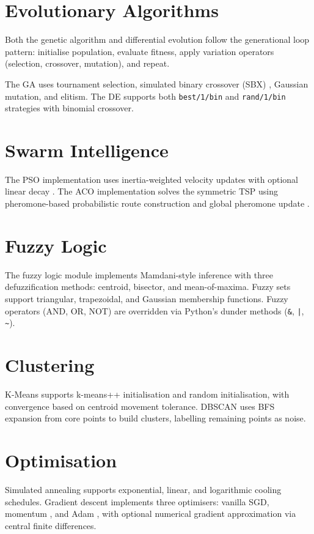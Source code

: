 \documentclass[12pt,a4paper,twoside]{report}
\begin{document}
\section{Evolutionary Algorithms}
Both the genetic algorithm and differential evolution follow the generational
loop pattern: initialise population, evaluate fitness, apply variation
operators (selection, crossover, mutation), and repeat.

The GA uses tournament selection, simulated binary crossover (SBX)
\citep{deb1995sbx}, Gaussian mutation, and elitism. The DE supports both
\texttt{best/1/bin} and \texttt{rand/1/bin} strategies with binomial crossover.

\section{Swarm Intelligence}
The PSO implementation uses inertia-weighted velocity updates with optional
linear decay \citep{shi1998modified}. The ACO implementation solves the
symmetric TSP using pheromone-based probabilistic route construction and
global pheromone update \citep{dorigo1996antsystem}.

\section{Fuzzy Logic}
The fuzzy logic module implements Mamdani-style inference with three
defuzzification methods: centroid, bisector, and mean-of-maxima.
Fuzzy sets support triangular, trapezoidal, and Gaussian membership
functions. Fuzzy operators (AND, OR, NOT) are overridden via Python's
dunder methods (\texttt{\&}, \texttt{|}, \texttt{\textasciitilde}).

\section{Clustering}
K-Means supports k-means++ initialisation and random initialisation, with
convergence based on centroid movement tolerance. DBSCAN uses BFS expansion
from core points to build clusters, labelling remaining points as noise.

\section{Optimisation}
Simulated annealing supports exponential, linear, and logarithmic cooling
schedules. Gradient descent implements three optimisers: vanilla SGD,
momentum \citep{rumelhart1986learning}, and Adam \citep{kingma2015adam},
with optional numerical gradient approximation via central finite differences.
\end{document}
